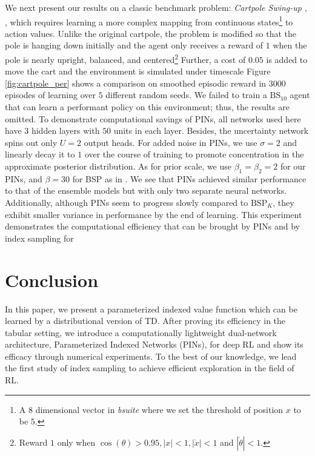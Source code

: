 \documentclass[letterpaper]{article} %
\newcommand{\abs}[1]{\left|#1\right|}
\theoremstyle{definition}
\begin{document}
We next present our results on a classic benchmark problem: \textit{Cartpole Swing-up} \cite{sutton2018reinforcement}, \cite{osband2019bsuite}, which requires learning a more complex mapping from continuous states\footnote{A $8$ dimensional vector in \textit{bsuite} where we set the threshold of position $x$ to be $5$.} to action values. Unlike the original cartpole, the problem is modified so that the pole is hanging down initially and the agent only receives a reward of $1$ when the pole is nearly upright, balanced, and centered\footnote{Reward $1$ only when $\cos(\theta) > 0.95, \abs{x} < 1, \abs{\Dot{x}} < 1$ and $|\Dot{\theta}| < 1$.} Further, a cost of $0.05$ is added to move the cart and the environment is simulated under timescale  Figure \ref{fig:cartpole_per} shows a comparison on smoothed episodic reward in $3000$ episodes of learning over $5$ different random seeds. We failed to train a $\mathrm{BS}_{10}$ agent that can learn a performant policy on this environment; thus, the results are omitted. To demonstrate computational savings of PINs, all networks used here have $3$ hidden layers with $50$ units in each layer. Besides, the uncertainty network spins out only $U=2$ output heads. For added noise in PINs, we use $\sigma=2$ and linearly decay it to $1$ over the course of training to promote concentration in the approximate posterior distribution. As for prior scale, we use $\beta_1=\beta_2=2$ for our PINs, and $\beta=30$ for BSP as in \cite{osband2018randomized}. We see that PINs achieved similar performance to that of the ensemble models but with only two separate neural networks. Additionally, although PINs seem to progress slowly compared to $\mathrm{BSP}_K$, they exhibit smaller variance in performance by the end of learning. This experiment demonstrates the computational efficiency that can be brought by PINs and by index sampling for

\vspace{-1.78mm}
\section{Conclusion}

In this paper, we present a parameterized indexed value function which can be learned by a distributional version of TD. After proving its efficiency in the tabular setting, we introduce a computationally lightweight dual-network architecture, Parameterized Indexed Networks (PINs), for deep RL and show its efficacy through numerical experiments. To the best of our knowledge, we lead the first study of index sampling to achieve efficient exploration in the field of RL.
\end{document}
